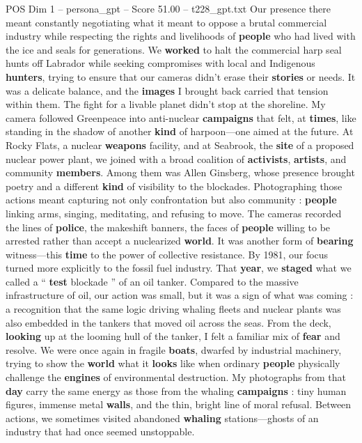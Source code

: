 \begin{textsample}{POS Dim 1 – persona\_gpt – Score 51.00 – t228\_gpt.txt}
Our presence there meant constantly negotiating what it meant to oppose a brutal commercial industry while respecting the rights and livelihoods of \textbf{people} who had lived with the ice and seals for generations.
We \textbf{worked} to halt the commercial harp seal hunts off Labrador while seeking compromises with local and Indigenous \textbf{hunters}, trying to ensure that our cameras didn't erase their \textbf{stories} or needs.
It was a delicate balance, and the \textbf{images} I brought back carried that tension within them.
The fight for a livable planet didn't stop at the shoreline.
My camera followed Greenpeace into anti-nuclear \textbf{campaigns} that felt, at \textbf{times}, like standing in the shadow of another \textbf{kind} of harpoon—one aimed at the future.
At Rocky Flats, a nuclear \textbf{weapons} facility, and at Seabrook, the \textbf{site} of a proposed nuclear power plant, we joined with a broad coalition of \textbf{activists}, \textbf{artists}, and community \textbf{members}.
Among them was Allen Ginsberg, whose presence brought poetry and a different \textbf{kind} of visibility to the blockades.
Photographing those actions meant capturing not only confrontation but also community : \textbf{people} linking arms, singing, meditating, and refusing to move.
The cameras recorded the lines of \textbf{police}, the makeshift banners, the faces of \textbf{people} willing to be arrested rather than accept a nuclearized \textbf{world}.
It was another form of \textbf{bearing} witness—this \textbf{time} to the power of collective resistance.
By 1981, our focus turned more explicitly to the fossil fuel industry.
That \textbf{year}, we \textbf{staged} what we called a “ \textbf{test} blockade ” of an oil tanker.
Compared to the massive infrastructure of oil, our action was small, but it was a sign of what was coming : a recognition that the same logic driving whaling fleets and nuclear plants was also embedded in the tankers that moved oil across the seas.
From the deck, \textbf{looking} up at the looming hull of the tanker, I felt a familiar mix of \textbf{fear} and resolve.
We were once again in fragile \textbf{boats}, dwarfed by industrial machinery, trying to show the \textbf{world} what it \textbf{looks} like when ordinary \textbf{people} physically challenge the \textbf{engines} of environmental destruction.
My photographs from that \textbf{day} carry the same energy as those from the whaling \textbf{campaigns} : tiny human figures, immense metal \textbf{walls}, and the thin, bright line of moral refusal.
Between actions, we sometimes visited abandoned \textbf{whaling} stations—ghosts of an industry that had once seemed unstoppable.

\end{textsample}
